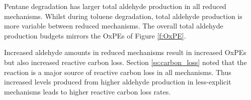 Pentane degradation has larger total aldehyde production in all reduced mechanisms.
Whilst during toluene degradation, total aldehyde production is more variable between reduced mechanisms.
The overall total aldehyde production budgets mirrors the OxPEs of Figure \ref{f:OxPE}.

Increased aldehyde amounts in reduced mechanisms result in increased OxPEs but also increased reactive carbon loss.
Section \ref{ss:carbon_loss} noted that the  reaction is a major source of reactive carbon loss in all mechanisms. 
Thus increased  levels produced from higher aldehyde production in less-explicit mechanisms leads to higher reactive carbon loss rates.
